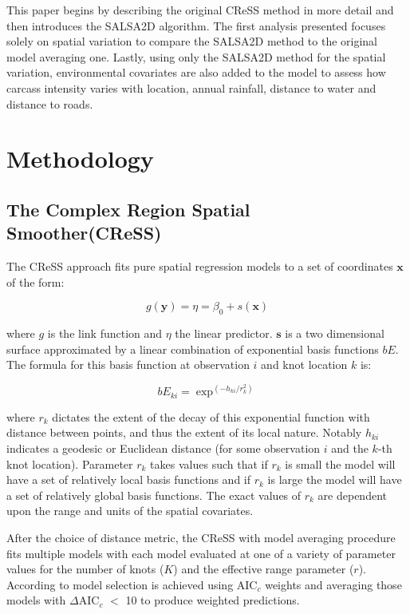 \documentclass[letterpaper, 12pt]{interact}
\begin{document}
	This paper begins by describing the original CReSS method in more detail and then introduces the SALSA2D algorithm.  The first analysis presented focuses solely on spatial variation to compare the SALSA2D method to the original model averaging one. Lastly, using only the SALSA2D method for the spatial variation, environmental covariates are also added to the model to assess how carcass intensity varies with location, annual rainfall, distance to water and distance to roads.  
	
	\section*{Methodology}
	
	\subsection*{The Complex Region Spatial Smoother(CReSS)}\label{the-complex-region-spatial-smoother-cress}
	
	The CReSS approach fits pure spatial regression models to a set of coordinates $\mathbf{x}$ of the form:
	
	\begin{equation}\label{eqmodframework}
		g(\mathbf{y}) = \eta = \beta_0 + s(\mathbf{x})
	\end{equation}
	
	where $g$ is the link function and $\eta$ the linear predictor. $\mathbf{s}$ is a two dimensional surface approximated by a linear combination of exponential basis functions \(bE\). The formula for this basis function at observation $i$ and knot location $k$ is:
	
	\begin{equation}\label{eqexp}
		bE_{ki} = \exp^{(-h_{ki}/r_k^{2})}
	\end{equation}
	
	where \(r_k\) dictates the extent of the decay of this exponential function with distance between points, and thus the extent of its local nature. Notably \(h_{ki}\) indicates a geodesic or Euclidean distance (for some observation \(i\) and the \(k\)-th knot location). Parameter \(r_{k}\) takes values such that if \(r_k\) is small the model will have a set of relatively local basis functions and if \(r_k\) is large the model will have a set of relatively global basis functions. The exact values of \(r_k\) are dependent upon the range and units of the spatial covariates.
	
	After the choice of distance metric, the CReSS with model averaging procedure fits multiple models with each model evaluated at one of a variety of parameter values for the number of knots (\(K\)) and the effective range parameter (\(r\)). According to \citet{scott2014} model selection is achieved using AIC\(_c\) \cite{sugiura1978} weights and averaging those models with \(\Delta\)AIC\(_c\) \(<\) 10 to produce weighted predictions.
	
\end{document}
